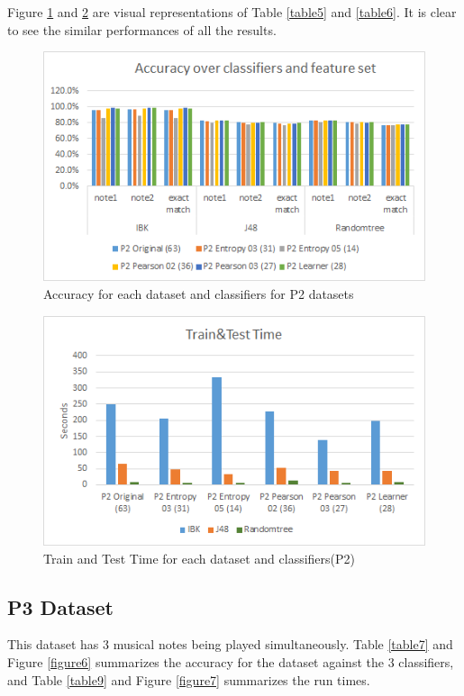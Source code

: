 \documentclass{article}
\begin{document}
Figure \ref{figure4} and \ref{figure5} are visual representations of Table \ref{table5} and \ref{table6}. It is clear to see the similar performances of all the results.

\begin{figure}[h]
\includegraphics[scale=.65]{accuracy_p2}
 \caption{Accuracy for each dataset and classifiers for P2 datasets}
\label{figure4}
\end{figure}

\begin{figure}[h]
\includegraphics[scale=.65]{time_p2}
 \caption{Train and Test Time for each dataset and classifiers(P2)}
\label{figure5}
\end{figure}




\subsection{P3 Dataset}
This dataset has 3 musical notes being played simultaneously. Table \ref{table7} and Figure \ref{figure6} summarizes the accuracy for the dataset against the 3 classifiers, and Table \ref{table9} and Figure \ref{figure7} summarizes the run times.
\end{document}
